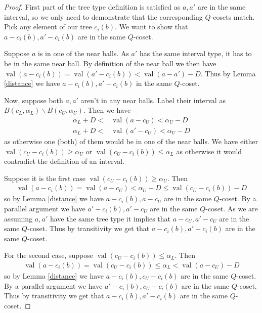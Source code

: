 \documentclass{amsart}
\DeclareMathOperator{\val}{val}
\begin{document}
\begin{proof}
	First part of the tree type definition is satisfied as $a, a'$ are in the same interval,
	so we only need to demonstrate that the corresponding $Q$-cosets match.
	Pick any element of our tree $c_i(b)$.
	We want to show that $a - c_i(b), a' - c_i(b)$ are in the same $Q$-coset.
		
	Suppose $a$ is in one of the near balls.
	As $a'$ has the same interval type, it has to be in the same near ball.
	By definition of the near ball we then have $\val(a - c_i(b)) = \val(a' - c_i(b)) < \val(a - a') - D$.
	Thus by Lemma \ref{distance} we have $a - c_i(b), a' - c_i(b)$ in the same $Q$-coset.
	
	Now, suppose both $a, a'$ aren't in any near balls.
	Label their interval as $B(c_L, \alpha_L) \backslash B(c_U, \alpha_U)$.
	Then we have 
	\begin{align*}
		\alpha_L + D < &\val (a - c_U) < \alpha_U - D \\
		\alpha_L + D < &\val (a' - c_U) < \alpha_U - D
	\end{align*}
	as otherwise one (both) of them would be in one of the near balls.
	We have either $\val(c_U - c_i(b)) \geq \alpha_U$ or $\val(c_U - c_i(b)) \leq \alpha_L$
	as otherwise it would contradict the definition of an interval.
	
	Suppose it is the first case $\val(c_U - c_i(b)) \geq \alpha_U$.
	Then
	\begin{align*}
		 \val(a - c_i(b)) = \val(a - c_U) < \alpha_U - D \leq \val(c_U - c_i(b)) - D
	\end{align*}
	so by Lemma \ref{distance} we have $a - c_i(b), a - c_U$ are in the same $Q$-coset.
	By a parallel argument we have $a' - c_i(b), a' - c_U$ are in the same $Q$-coset.
	As we are assuming $a, a'$ have the same tree type it implies that $a - c_U, a' - c_U$ are in the same $Q$-coset.
	Thus by transitivity we get that $a - c_i(b), a' - c_i(b)$ are in the same $Q$-coset.
	
	For the second case, suppose $\val(c_U - c_i(b)) \leq \alpha_L$.
	Then
	\begin{align*}
		\val(a - c_i(b)) = \val(c_U - c_i(b)) \leq \alpha_L < \val(a - c_U) - D
	\end{align*}
	so by Lemma \ref{distance} we have $a - c_i(b), c_U - c_i(b)$ are in the same $Q$-coset.
	By a parallel argument we have $a' - c_i(b), c_U - c_i(b)$ are in the same $Q$-coset.
	Thus by transitivity we get that $a - c_i(b), a' - c_i(b)$ are in the same $Q$-coset.
\end{proof}
\end{document}
